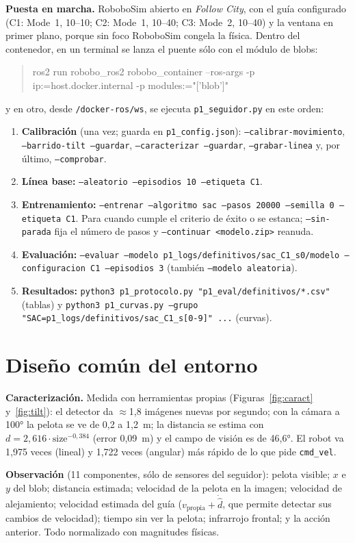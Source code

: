 \documentclass[11pt,a4paper]{article}
\newcommand{\cod}[1]{\texttt{\small #1}}
\begin{document}
\textbf{Puesta en marcha.} RoboboSim abierto en \emph{Follow City}, con el guía configurado (C1: Mode~1, 10--10;
C2: Mode~1, 10--40; C3: Mode~2, 10--40) y la ventana en primer plano, porque sin foco RoboboSim congela la
física. Dentro del contenedor, en un terminal se lanza el puente sólo con el módulo de blobs:
\begin{quote}\small\ttfamily
ros2 run robobo\_ros2 robobo\_container --ros-args -p ip:=host.docker.internal -p modules:="['blob']"
\end{quote}
y en otro, desde \cod{/docker-ros/ws}, se ejecuta \cod{p1\_seguidor.py} en este orden:
\begin{enumerate}
\item \textbf{Calibración} (una vez; guarda en \cod{p1\_config.json}): \cod{--calibrar-movimiento},
\cod{--barrido-tilt --guardar}, \cod{--caracterizar --guardar}, \cod{--grabar-linea} y, por último,
\cod{--comprobar}.
\item \textbf{Línea base:} \cod{--aleatorio --episodios 10 --etiqueta C1}.
\item \textbf{Entrenamiento:} \cod{--entrenar --algoritmo sac --pasos 20000 --semilla 0 --etiqueta C1}. Para
cuando cumple el criterio de éxito o se estanca; \cod{--sin-parada} fija el número de pasos y
\cod{--continuar <modelo.zip>} reanuda.
\item \textbf{Evaluación:} \cod{--evaluar --modelo p1\_logs/definitivos/sac\_C1\_s0/modelo --configuracion C1
--episodios 3} (también \cod{--modelo aleatoria}).
\item \textbf{Resultados:} \cod{python3 p1\_protocolo.py "p1\_eval/definitivos/*.csv"} (tablas) y
\cod{python3 p1\_curvas.py --grupo "SAC=p1\_logs/definitivos/sac\_C1\_s[0-9]" ...} (curvas).
\end{enumerate}

\section{Diseño común del entorno}

\textbf{Caracterización.} Medida con herramientas propias (Figuras~\ref{fig:caract} y~\ref{fig:tilt}): el
detector da $\approx$1,8 imágenes nuevas por segundo; con la cámara a 100° la pelota se ve de 0,2 a 1,2~m; la
distancia se estima con $d=2{,}616\cdot\text{size}^{-0{,}384}$ (error 0,09~m) y el campo de visión es de 46,6°.
El robot va 1,975 veces (lineal) y 1,722 veces (angular) más rápido de lo que pide \cod{cmd\_vel}.

\textbf{Observación} (11 componentes, sólo de sensores del seguidor): pelota visible; $x$ e $y$ del blob;
distancia estimada; velocidad de la pelota en la imagen; velocidad de alejamiento; velocidad estimada del guía
($v_{\text{propia}}+\dot{\hat d}$, que permite detectar sus cambios de velocidad); tiempo sin ver la pelota;
infrarrojo frontal; y la acción anterior. Todo normalizado con magnitudes físicas.
\end{document}
